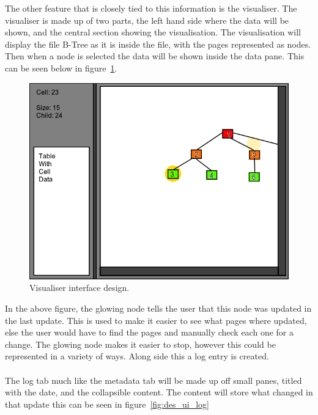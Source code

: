 The other feature that is closely tied to this information is the visualiser. The visualiser is made up of two parts, the left hand side where the data will be shown, and the central section showing the visualisation. The visualisation will display the file B-Tree as it is inside the file, with the pages represented as nodes. Then when a node is selected the data will be shown inside the data pane. This can be seen below in figure~\ref{fig:des_ui_vis}.

\begin{figure}[H]
	\centering
	\includegraphics[scale=0.32]{images/ui_visuliser.png}
	\caption{Visualiser interface design.}
	\label{fig:des_ui_vis}
\end{figure}

In the above figure, the glowing node tells the user that this node was updated in the last update. This is used to make it easier to see what pages where updated, else the user would have to find the pages and manually check each one for a change. The glowing node makes it easier to stop, however this could be represented in a variety of ways. Along side this a log entry is created. 
\\\\
The log tab much like the metadata tab will be made up off small panes, titled with the date, and the collapsible content. The content will store what changed in that update this can be seen in figure~\ref{fig:des_ui_log}

